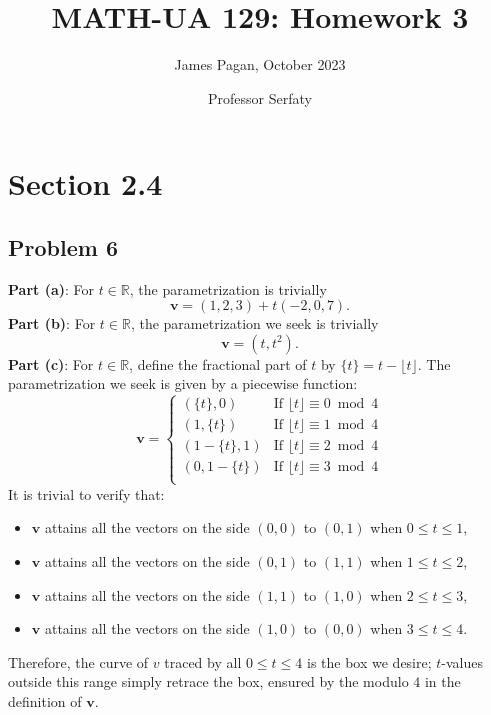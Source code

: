 \documentclass[11pt]{article}
\title{MATH-UA 129: Homework 3}
\author{James Pagan, October 2023}
\date{Professor Serfaty}
\renewcommand{\vec}[1]{\mathbf{#1}}
\begin{document}
\maketitle
\tableofcontents


\section{Section 2.4}


\subsection{Problem 6}

\textbf{Part (a)}: For $t \in \mathbb{R}$, the parametrization is trivially
\[
	\boxed{\vec{v} = (1, 2, 3) + t (-2, 0, 7)}.
\]
\textbf{Part (b)}: For $t \in \mathbb{R}$, the parametrization we seek is trivially
\[
	\boxed{\vec{v} = (t, t^{2})}.
\]
\textbf{Part (c)}: For $t \in \mathbb{R}$, define the fractional part of $t$ by $\{ t \} = t - \lfloor t \rfloor$. The parametrization we seek is given by a piecewise function:
\[
	\vec{v} = 
	\begin{cases}
		(\{ t \}, 0) & \text{If $\lfloor t \rfloor \equiv 0 \bmod{4}$} \\
		(1, \{ t \}) & \text{If $\lfloor t \rfloor \equiv 1 \bmod{4}$} \\
		(1 - \{ t \}, 1) & \text{If $\lfloor t \rfloor \equiv 2 \bmod{4}$} \\
		(0, 1 - \{ t \}) & \text{If $\lfloor t \rfloor \equiv 3 \bmod{4}$} \\
	\end{cases}
\]
It is trivial to verify that:
\begin{itemize}
	\item $\vec{v}$ attains all the vectors on the side $(0, 0)$ to $(0, 1)$ when $0 \le t \le 1$, 
	\item $\vec{v}$ attains all the vectors on the side $(0, 1)$ to $(1, 1)$ when $1 \le t \le 2$,
	\item $\vec{v}$ attains all the vectors on the side $(1, 1)$ to $(1, 0)$ when $2 \le t \le 3$,
	\item $\vec{v}$ attains all the vectors on the side $(1, 0)$ to $(0, 0)$ when $3 \le t \le 4$.
\end{itemize}

Therefore, the curve of $v$ traced by all $0 \le t \le 4$ is the box we desire; $t$-values outside this range simply retrace the box, ensured by the modulo $4$ in the definition of $\vec{v}$.
\end{document}
